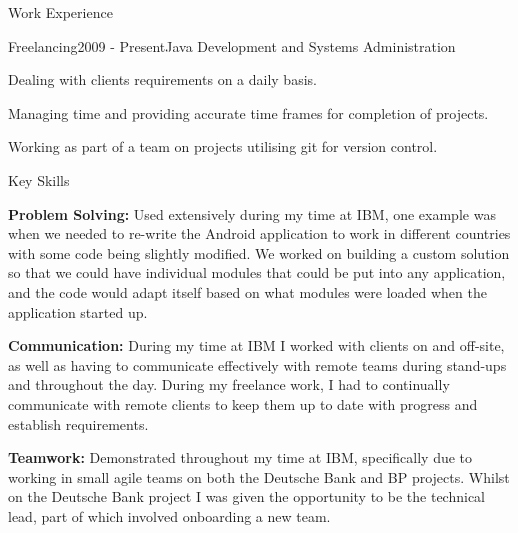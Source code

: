 \documentclass{resume} %
\begin{document}
\begin{rSection}{Work Experience}

\begin{rSubsection}{Freelancing}{2009 - Present}{Java Development and Systems Administration}{}
\item Dealing with clients requirements on a daily basis.
\item Managing time and providing accurate time frames for completion of projects.
\item Working as part of a team on projects utilising git for version control.
\end{rSubsection}

\end{rSection}


\begin{rSectionList}{Key Skills}
\item \textbf{Problem Solving:}
Used extensively during my time at IBM, one example was when we needed to re-write the Android application to work in different countries with some code being slightly modified. We worked on building a custom solution so that we could have individual modules that could be put into any application, and the code would adapt itself based on what modules were loaded when the application started up.

\item \textbf{Communication:} 
During my time at IBM I worked with clients on and off-site, as well as having to communicate effectively with remote teams during stand-ups and throughout the day. During my freelance work, I had to continually communicate with remote clients to keep them up to date with progress and establish requirements.

\item \textbf{Teamwork:}
Demonstrated throughout my time at IBM, specifically due to working in small agile teams on both the Deutsche Bank and BP projects. Whilst on the Deutsche Bank project I was given the opportunity to be the technical lead, part of which involved onboarding a new team.
\end{rSectionList}

\end{document}
